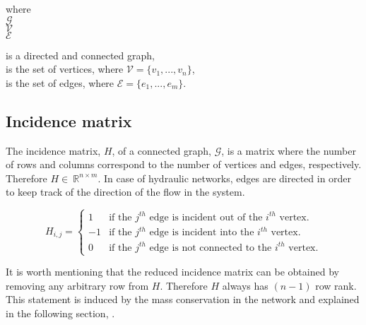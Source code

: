 \begin{minipage}[t]{0.2\textwidth}
where\\
\hspace*{8mm} $\mathcal{G} $ \\
\hspace*{8mm} $\mathcal{V} $ \\
\hspace*{8mm} $\mathcal{E} $
\end{minipage}
\begin{minipage}[t]{0.68\textwidth}
\vspace*{2mm}
is a directed and connected graph,\\
is the set of vertices, where $\mathcal{V} = \{v_1, ..., v_n\}$,\\
is the set of edges, where $\mathcal{E} = \{e_1, ..., e_m\}$. 
\end{minipage}

\subsection{Incidence matrix}
\label{incidence_matrix}

The incidence matrix, $H$, of a connected graph, $\mathcal{G}$, is a matrix where the number of rows and columns correspond to the number of vertices and edges, respectively. Therefore $H\in \: \mathbb{R}^{n \times m}$. In case of hydraulic networks, edges are directed in order to keep track of the direction of the flow in the system. 

\begin{equation}
\label{DiGraph}
 H_{i,j} =
		\left\{
		\begin{array}{ll}
		
		1 			&      \text{if the $j^{th}$ edge is incident out of the $i^{th}$ vertex}.	
\\
	    -1          &      \text{if the $j^{th}$ edge is incident into the $i^{th}$ vertex}.
\\
        0           &      \text{if the $j^{th}$ edge is not connected to the $i^{th}$ vertex}.

		\end{array}
		\right.
\end{equation}	

It is worth mentioning that the reduced incidence matrix can be obtained by removing any arbitrary row from $H$. Therefore $H$ always has $(n-1)$ row rank. This statement is induced by the mass conservation in the network and explained in the following section, .

